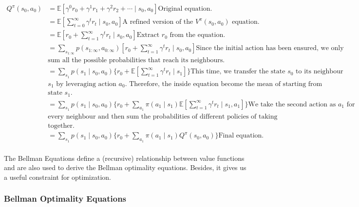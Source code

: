 \documentclass[11pt]{article}
\begin{document}
\begin{align*}
Q^{\pi}(s_0, a_0) &=\mathbb{E}\left[\gamma^{0} r_{0} + \gamma^{1} r_{1} +\gamma^{2} r_{2} + \cdots \mid s_{0}, a_{0}\right] \text{Original equation.} \\
&=\mathbb{E}\left[\sum_{t=0}^{\infty} \gamma^{t} r_{t} \mid s_{0}, a_{0} \right] \text{A refined version of the $V^{\pi}(s_{0}, a_{0})$ equation.} \\
&=\mathbb{E}\left[r_{0} + \sum_{t=1}^{\infty} \gamma^{t} r_{t} \mid s_{0}, a_{0}\right] \text{Extract $r_0$ from the equation.} \\
&=\sum_{s_{1: \infty}} p\left(s_{1: \infty}, a_{0: \infty}\right)\left[r_0 + \sum_{t=1}^{\infty} \gamma^{t} r_{t} \mid s_{0}, a_{0}\right] \text{Since the initial action has been ensured, we only } \\ & \text{sum all the possible probabilities that reach its neighbours.} \\
&=\sum_{s_{1}} p\left(s_{1}\mid s_{0}, a_{0}\right)\{r_0 + \mathbb{E}\left[\sum_{t=1}^{\infty} \gamma^{t} r_{t} \mid s_{1}\right]\} \text{This time, we transfer the state $s_0$ to its neighbour } \\ & \text{$s_1$ by leveraging action $a_0$. Therefore, the inside equation become the mean of starting from } \\ & \text{state $s_1$.} \\
&=\sum_{s_{1}} p\left(s_{1}\mid s_{0}, a_{0}\right)\{r_0 + \sum_{a_{1}}\pi(a_{1}\mid s_{1})\mathbb{E}\left[\sum_{t=1}^{\infty} \gamma^{t} r_{t} \mid s_{1}, a_{1}\right]\} \text{We take the second action as $a_{1}$ for } \\ & \text{every neighbour and then sum the probabilities of different policies of taking different actions } \\ & \text{together.} \\
&=\sum_{s_{1}} p\left(s_{1}\mid s_{0}, a_{0}\right)\{r_0 + \sum_{a_{1}}\pi(a_{1}\mid s_{1})Q^{\pi}(s_0, a_0)\} \text{Final equation.} \\
\end{align*}



The Bellman Equations define a (recursive) relationship between value functions and are also used to derive the Bellman optimality equations. Besides, it gives us a useful constraint for optimization.

\subsubsection{Bellman Optimality Equations}
\end{document}
